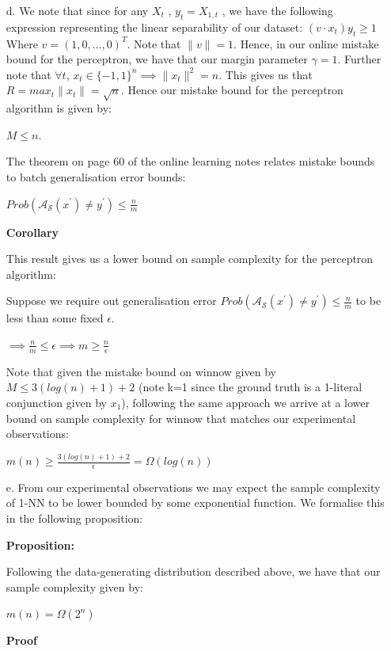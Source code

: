 \documentclass[12pt]{article}
\begin{document}
\begin{itemize}
\newpage
    \item[d.]
    We note that since for any $X_{t}$ , $y_{t} = X_{1,t}$ , we have the following
     expression representing the linear separability of our dataset:
    $(v \cdot x_{t})y_{t} \ge 1$
    Where $v = (1,0, \dots, 0)^{T}$. Note that $\|v\| =1$.
    Hence, in our online mistake bound for the perceptron, we have that our margin parameter $\gamma =1$.
    Further note that $\forall t$, $x_{t} \in \{-1,1\}^{n} \implies \|x_{t}\|^{2}
    = n$. This gives us that $R = max_{t} \|x_{t}\| = \sqrt{n}$.
    Hence our mistake bound for the perceptron algorithm is given by:
    
    $M \le n $.

    The theorem on page 60 of the online learning notes relates mistake bounds to batch generalisation error bounds:

    $Prob(\mathcal{A_{S}}(x ^{\prime}) \ne y^{\prime} ) \le \frac{n}{m}$

    \textbf{Corollary}

    This result gives us a lower bound on sample complexity for the perceptron algorithm:

    Suppose we require out generalisation error $ Prob(\mathcal{A_{S}}(x ^{\prime}) \ne y^{\prime} ) \le \frac{n}{m}$ to be  less than some fixed $\epsilon$.

    $\implies \frac{n}{m} \le \epsilon \implies m \ge \frac{n}{\epsilon}$

    Note that given the mistake bound on winnow given by $ M \le 3 (log(n) + 1) +2$ (note k=1 since the ground truth is a 1-literal conjunction given by $x_{1}$), following the same approach we arrive at a lower bound on sample complexity for winnow that
    matches our experimental observations:

    $m(n) \ge \frac{3 (log(n) + 1) +2}{\epsilon} = \Omega (log(n))$


\newpage

     \item[e.]
     From our experimental observations we may expect the sample complexity of 1-NN to be lower bounded by some exponential function. We formalise this in the following proposition:

     \textbf{Proposition:}

     Following the data-generating distribution described above, we have that our sample complexity given by:
 
     $m(n) = \Omega (2^{n})$ 

    \textbf{Proof}


\end{itemize}
\end{document}

